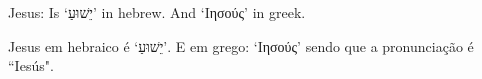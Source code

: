 \documentclass[12pt]{scrartcl}
\begin{document}
  {\Large Jesus: Is `\texthebrew{יֵשׁוּעַ}' in hebrew. And `\textgreek{Ιησούς}' in greek.}

  \vspace{1cm}

  {\Large Jesus em hebraico é `\texthebrew{יֵשׁוּעַ}'. E em grego: `\textgreek{Ιησούς}' sendo que a pronunciação é ``Iesús".}
\end{document}
